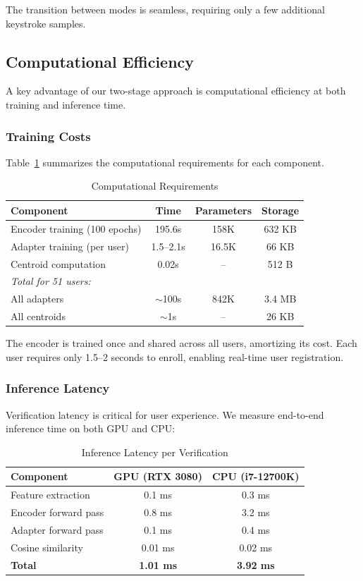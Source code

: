 \documentclass{ieeeaccess}
\begin{document}
{The transition between modes is seamless, requiring only a few additional keystroke samples.

\subsection{Computational Efficiency}

A key advantage of our two-stage approach is computational efficiency at both training and inference time.

\subsubsection{Training Costs}
Table~\ref{tab:training_cost} summarizes the computational requirements for each component.

\begin{table}[h]
\caption{Computational Requirements}
\label{tab:training_cost}
\centering
\begin{tabular}{|l|c|c|c|}
\hline
\textbf{Component} & \textbf{Time} & \textbf{Parameters} & \textbf{Storage} \\
\hline
Encoder training (100 epochs) & 195.6s & 158K & 632 KB \\
Adapter training (per user) & 1.5--2.1s & 16.5K & 66 KB \\
Centroid computation & 0.02s & -- & 512 B \\
\hline
\multicolumn{4}{|l|}{\textit{Total for 51 users:}} \\
\hline
All adapters & $\sim$100s & 842K & 3.4 MB \\
All centroids & $\sim$1s & -- & 26 KB \\
\hline
\end{tabular}
\end{table}

The encoder is trained once and shared across all users, amortizing its cost. Each user requires only 1.5--2 seconds to enroll, enabling real-time user registration.

\subsubsection{Inference Latency}
Verification latency is critical for user experience. We measure end-to-end inference time on both GPU and CPU:

\begin{table}[h]
\caption{Inference Latency per Verification}
\label{tab:latency}
\centering
\begin{tabular}{|l|c|c|}
\hline
\textbf{Component} & \textbf{GPU (RTX 3080)} & \textbf{CPU (i7-12700K)} \\
\hline
Feature extraction & 0.1 ms & 0.3 ms \\
Encoder forward pass & 0.8 ms & 3.2 ms \\
Adapter forward pass & 0.1 ms & 0.4 ms \\
Cosine similarity & 0.01 ms & 0.02 ms \\
\hline
\textbf{Total} & \textbf{1.01 ms} & \textbf{3.92 ms} \\
\hline
\end{tabular}
\end{table}

}
\end{document}
